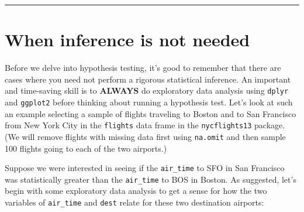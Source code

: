 \documentclass[12pt,]{krantz}
\makeatletter
\newenvironment{Shaded}{\begin{snugshade}}{\end{snugshade}}
\newcommand{\KeywordTok}[1]{\textcolor[rgb]{0.27,0.27,0.27}{\textbf{#1}}}
\newcommand{\DataTypeTok}[1]{\textcolor[rgb]{0.27,0.27,0.27}{#1}}
\newcommand{\DecValTok}[1]{\textcolor[rgb]{0.06,0.06,0.06}{#1}}
\newcommand{\StringTok}[1]{\textcolor[rgb]{0.5,0.5,0.5}{#1}}
\newcommand{\OperatorTok}[1]{\textcolor[rgb]{0.43,0.43,0.43}{\textbf{#1}}}
\newcommand{\NormalTok}[1]{#1}
\newenvironment{kframe}{%
\medskip{}
\setlength{\fboxsep}{.8em}
 \def\at@end@of@kframe{}%
 \ifinner\ifhmode%
  \def\at@end@of@kframe{\end{minipage}}%
  \begin{minipage}{\columnwidth}%
 \fi\fi%
 \def\FrameCommand##1{\hskip\@totalleftmargin \hskip-\fboxsep
 \colorbox{shadecolor}{##1}\hskip-\fboxsep
     \hskip-\linewidth \hskip-\@totalleftmargin \hskip\columnwidth}%
 \MakeFramed {\advance\hsize-\width
   \@totalleftmargin\z@ \linewidth\hsize
   \@setminipage}}%
 {\par\unskip\endMakeFramed%
 \at@end@of@kframe}
\renewenvironment{Shaded}{\begin{kframe}}{\end{kframe}}
\theoremstyle{definition}
\theoremstyle{definition}
\theoremstyle{definition}
\theoremstyle{remark}
\makeatother
\begin{document}
\begin{center}\rule{0.5\linewidth}{\linethickness}\end{center}

\section{When inference is not
needed}\label{when-inference-is-not-needed}

Before we delve into hypothesis testing, it's good to remember that
there are cases where you need not perform a rigorous statistical
inference. An important and time-saving skill is to \textbf{ALWAYS} do
exploratory data analysis using \texttt{dplyr} and \texttt{ggplot2}
before thinking about running a hypothesis test. Let's look at such an
example selecting a sample of flights traveling to Boston and to San
Francisco from New York City in the \texttt{flights} data frame in the
\texttt{nycflights13} package. (We will remove flights with missing data
first using \texttt{na.omit} and then sample 100 flights going to each
of the two airports.)

\begin{Shaded}
\end{Shaded}

Suppose we were interested in seeing if the \texttt{air\_time} to SFO in
San Francisco was statistically greater than the \texttt{air\_time} to
BOS in Boston. As suggested, let's begin with some exploratory data
analysis to get a sense for how the two variables of \texttt{air\_time}
and \texttt{dest} relate for these two destination airports:

\begin{Shaded}
\end{Shaded}
\end{document}
